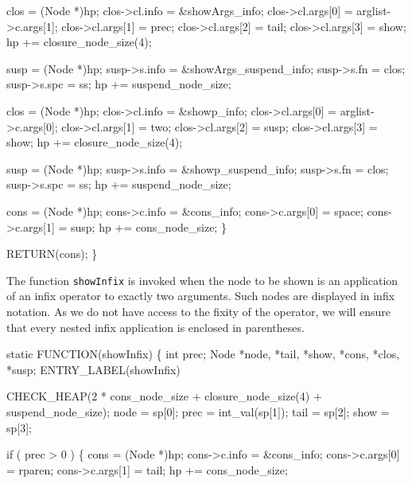         clos             = (Node *)hp;
        clos->cl.info    = &showArgs_info;
        clos->cl.args[0] = arglist->c.args[1];
        clos->cl.args[1] = prec;
        clos->cl.args[2] = tail;
        clos->cl.args[3] = show;
        hp              += closure_node_size(4);

        susp         = (Node *)hp;
        susp->s.info = &showArgs_suspend_info;
        susp->s.fn   = clos;
        susp->s.spc  = ss;
        hp          += suspend_node_size;

        clos             = (Node *)hp;
        clos->cl.info    = &showp_info;
        clos->cl.args[0] = arglist->c.args[0];
        clos->cl.args[1] = two;
        clos->cl.args[2] = susp;
        clos->cl.args[3] = show;
        hp              += closure_node_size(4);

        susp         = (Node *)hp;
        susp->s.info = &showp_suspend_info;
        susp->s.fn   = clos;
        susp->s.spc  = ss;
        hp          += suspend_node_size;

        cons            = (Node *)hp;
        cons->c.info    = &cons_info;
        cons->c.args[0] = space;
        cons->c.args[1] = susp;
        hp             += cons_node_size;
    \}

    RETURN(cons);
\}

\nwendcode{}\nwdocspar
The function \texttt{showInfix} is invoked when the node to be shown
is an application of an infix operator to exactly two arguments. Such
nodes are displayed in infix notation. As we do not have access to the
fixity of the operator, we will ensure that every nested infix
application is enclosed in parentheses.

\nwenddocs{}\plusendmoddef\nwstartdeflinemarkup{}\nwenddeflinemarkup
static
FUNCTION(showInfix)
\{
    int prec;
    Node *node, *tail, *show, *cons, *clos, *susp;
 ENTRY_LABEL(showInfix)

    CHECK_HEAP(2 * cons_node_size + closure_node_size(4) + suspend_node_size);
    node = sp[0];
    prec = int_val(sp[1]);
    tail = sp[2];
    show = sp[3];

    if ( prec > 0 )
    \{
        cons            = (Node *)hp;
        cons->c.info    = &cons_info;
        cons->c.args[0] = rparen;
        cons->c.args[1] = tail;
        hp             += cons_node_size;

